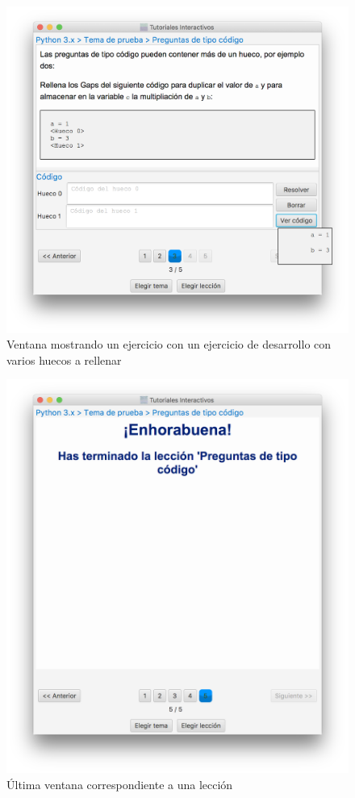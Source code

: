 \documentclass[]{article}
\begin{document}
%
\begin{figure}[tbp]
\begin{center}
\includegraphics[scale=0.35]{l_7.png}
\end{center}
\caption{Ventana mostrando un ejercicio con un ejercicio de desarrollo con varios huecos a rellenar\label{fig:l_7}}
\end{figure}
%

%
\begin{figure}[tbp]
\begin{center}
\includegraphics[scale=0.35]{l_8.png}
\end{center}
\caption{Última ventana correspondiente a una lección\label{fig:l_8}}
\end{figure}
%
\end{document}
